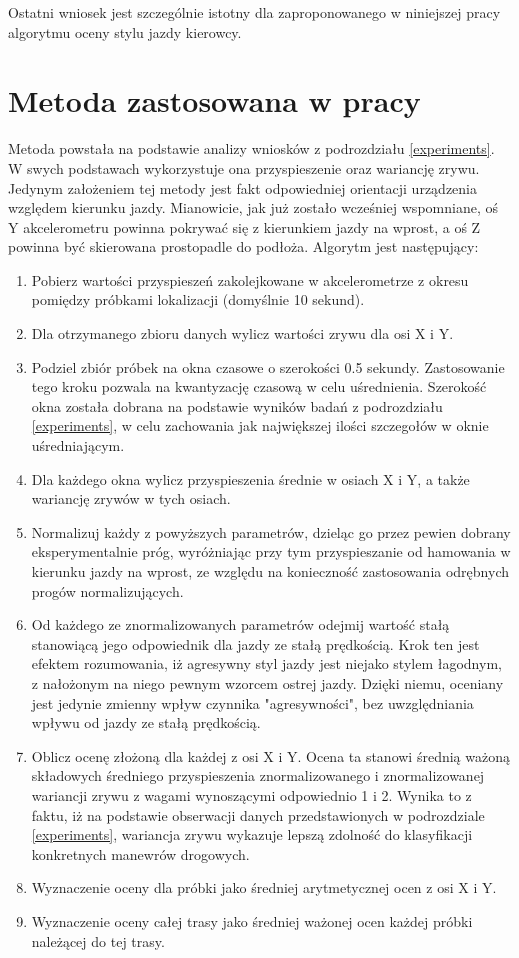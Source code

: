 Ostatni wniosek jest szczególnie istotny dla zaproponowanego w niniejszej pracy algorytmu oceny stylu jazdy kierowcy. 

\section{Metoda zastosowana w pracy}

Metoda powstała na podstawie analizy wniosków z podrozdziału \ref{experiments}. W swych podstawach wykorzystuje ona przyspieszenie oraz wariancję zrywu. Jedynym założeniem tej metody jest fakt odpowiedniej orientacji urządzenia względem kierunku jazdy. Mianowicie, jak już zostało wcześniej wspomniane, oś Y akcelerometru powinna pokrywać się z kierunkiem jazdy na wprost, a oś Z powinna być skierowana prostopadle do podłoża. Algorytm jest następujący:

\begin{enumerate}
\item Pobierz wartości przyspieszeń zakolejkowane w akcelerometrze z okresu pomiędzy próbkami lokalizacji (domyślnie 10 sekund).
\item Dla otrzymanego zbioru danych wylicz wartości zrywu dla osi X i Y.
\item Podziel zbiór próbek na okna czasowe o szerokości 0.5 sekundy. Zastosowanie tego kroku pozwala na kwantyzację czasową w celu uśrednienia. Szerokość okna została dobrana na podstawie wyników badań z podrozdziału \ref{experiments}, w celu zachowania jak największej ilości szczegołów w oknie uśredniającym.
\item Dla każdego okna wylicz przyspieszenia średnie w osiach X i Y, a także wariancję zrywów w tych osiach.
\item Normalizuj każdy z powyższych parametrów, dzieląc go przez pewien dobrany eksperymentalnie próg, wyróżniając przy tym przyspieszanie od hamowania w kierunku jazdy na wprost, ze względu na konieczność zastosowania odrębnych progów normalizujących.
\item Od każdego ze znormalizowanych parametrów odejmij wartość stałą stanowiącą jego odpowiednik dla jazdy ze stałą prędkością. Krok ten jest efektem rozumowania, iż agresywny styl jazdy jest niejako stylem łagodnym, z nałożonym na niego pewnym wzorcem ostrej jazdy. Dzięki niemu, oceniany jest jedynie zmienny wpływ czynnika "agresywności", bez uwzględniania wpływu od jazdy ze stałą prędkością.
\item Oblicz ocenę złożoną dla każdej z osi X i Y. Ocena ta stanowi średnią ważoną składowych średniego przyspieszenia znormalizowanego i znormalizowanej wariancji zrywu z wagami wynoszącymi odpowiednio 1 i 2. Wynika to z faktu, iż na podstawie obserwacji danych przedstawionych w podrozdziale \ref{experiments}, wariancja zrywu wykazuje lepszą zdolność do klasyfikacji konkretnych manewrów drogowych.
\item Wyznaczenie oceny dla próbki jako średniej arytmetycznej ocen z osi X i Y.
\item Wyznaczenie oceny całej trasy jako średniej ważonej ocen każdej próbki należącej do tej trasy.
\end{enumerate}

